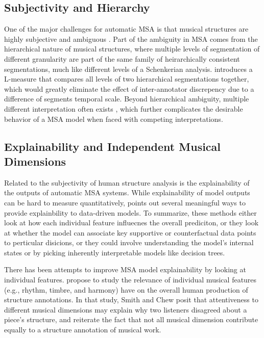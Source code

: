 \subsection{Subjectivity and Hierarchy}
One of the major challenges for automatic MSA is that musical structures are highly subjective and ambiguous \citep{smith2014b}.
Part of the ambiguity in MSA comes from the hierarchical nature of musical structures, where multiple levels of segmentation of different granularity are part of the same family of heirarchically consistent segmentations, much like different levels of a Schenkerian analysis.
\cite{mcfee2017evaluating} introduces a L-measure that compares all levels of two hierarchical segmentations together, which would greatly eliminate the effect of inter-annotator discrepency due to a difference of segments temporal scale.
Beyond hierarchical ambiguity, multiple different interpretation often exists \citep{wang2017, serra2014}, which further complicates the desirable behavior of a MSA model when faced with competing interpretations.

\subsection{Explainability and Independent Musical Dimensions}
Related to the subjectivity of human structure analysis is the explainability of the outputs of automatic MSA systems.
While explainability of model outputs can be hard to measure quantitatively, \cite{molnar2019} points out several meaningful ways to provide explainbility to data-driven models.
To summarize, these methods either look at how each individual feature influecnes the overall prediciton, or they look at whether the model can associate key supportive or counterfactual data points to perticular disicions, or they could involve understanding the model's internal states or by picking inherently interpretable models like decision trees.

There has been attempts to improve MSA model explainability by looking at individual features.
\cite{smith2013quadratic} propose to study the relevance of individual musical features (e.g., rhythm, timbre, and harmony) have on the overall human production of structure annotations.
In that study, Smith and Chew posit that attentiveness to different musical dimensions may explain why two listeners disagreed about a piece's structure, and reiterate the fact that not all musical dimension contribute equally to a structure annotation of musical work.

